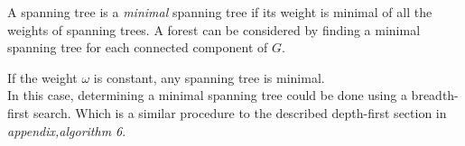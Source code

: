 \documentclass[../main.tex]{subfiles}
\begin{document}
\begin{defn}
A spanning tree is a \textit{minimal} spanning tree if its weight is minimal of all the weights of spanning trees.
\noindent A forest can be considered by finding a minimal spanning tree for each connected component of $G.$
\end{defn}

\begin{rem}
If the weight $\omega$ is constant, any spanning tree is minimal.\\
\noindent In this case, determining a minimal spanning tree could be done using a breadth-first search. Which is a similar procedure to the described depth-first section in \textit{appendix,algorithm 6}.
\end{rem}

 
\end{document}

